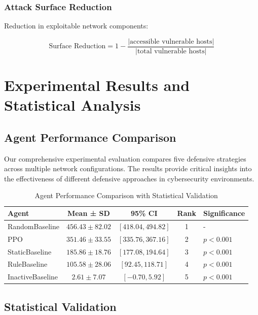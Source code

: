 \documentclass[12pt]{article}
\theoremstyle{definition}
\theoremstyle{plain}
\begin{document}
\subsubsection{Attack Surface Reduction}
Reduction in exploitable network components:

\begin{equation}
\text{Surface Reduction} = 1 - \frac{|\text{accessible vulnerable hosts}|}{|\text{total vulnerable hosts}|}
\end{equation}

\section{Experimental Results and Statistical Analysis}

\subsection{Agent Performance Comparison}

Our comprehensive experimental evaluation compares five defensive strategies across multiple network configurations. The results provide critical insights into the effectiveness of different defensive approaches in cybersecurity environments.

\begin{table}[H]
\centering
\caption{Agent Performance Comparison with Statistical Validation}
\label{tab:agent_performance}
\begin{tabular}{lcccl}
\toprule
\textbf{Agent} & \textbf{Mean ± SD} & \textbf{95\% CI} & \textbf{Rank} & \textbf{Significance} \\
\midrule
RandomBaseline & $456.43 \pm 82.02$ & $[418.04, 494.82]$ & 1 & - \\
PPO & $351.46 \pm 33.55$ & $[335.76, 367.16]$ & 2 & $p < 0.001$ \\
StaticBaseline & $185.86 \pm 18.76$ & $[177.08, 194.64]$ & 3 & $p < 0.001$ \\
RuleBaseline & $105.58 \pm 28.06$ & $[92.45, 118.71]$ & 4 & $p < 0.001$ \\
InactiveBaseline & $2.61 \pm 7.07$ & $[-0.70, 5.92]$ & 5 & $p < 0.001$ \\
\bottomrule
\end{tabular}
\end{table}

\subsection{Statistical Validation}
\end{document}

